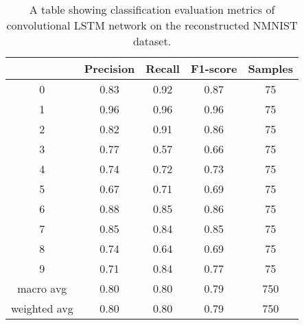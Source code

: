 \begin{table}[htb]
    \centering
    \begin{tabular}{|| c | c | c | c | c ||}
        \hline
             & Precision & Recall & F1-score & Samples \\
        \hline \hline
        0            & 0.83 & 0.92 & 0.87 & 75  \\
        \hline
        1            & 0.96 & 0.96 & 0.96 & 75  \\
        \hline
        2            & 0.82 & 0.91 & 0.86 & 75  \\
        \hline
        3            & 0.77 & 0.57 & 0.66 & 75  \\
        \hline
        4            & 0.74 & 0.72 & 0.73 & 75  \\
        \hline
        5            & 0.67 & 0.71 & 0.69 & 75  \\
        \hline
        6            & 0.88 & 0.85 & 0.86 & 75  \\
        \hline
        7            & 0.85 & 0.84 & 0.85 & 75  \\
        \hline
        8            & 0.74 & 0.64 & 0.69 & 75  \\
        \hline
        9            & 0.71 & 0.84 & 0.77 & 75  \\
        \hline
        macro avg    & 0.80 & 0.80 & 0.79 & 750 \\
        \hline
        weighted avg & 0.80 & 0.80 & 0.79 & 750 \\
        \hline
    \end{tabular}
    \caption{A table showing classification evaluation metrics of convolutional LSTM network on the reconstructed NMNIST dataset.}
    \label{tab:conv_lstm_nmnist_recon_evaluation_metrics}
\end{table}

